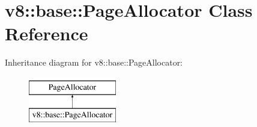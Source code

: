 \hypertarget{classv8_1_1base_1_1PageAllocator}{}\section{v8\+:\+:base\+:\+:Page\+Allocator Class Reference}
\label{classv8_1_1base_1_1PageAllocator}
Inheritance diagram for v8\+:\+:base\+:\+:Page\+Allocator\+:\begin{figure}[H]
\begin{center}
\leavevmode
\includegraphics[height=2.000000cm]{classv8_1_1base_1_1PageAllocator}
\end{center}
\end{figure}
